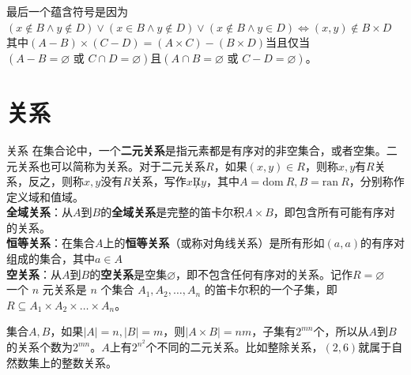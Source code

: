 最后一个蕴含符号是因为$(x \notin B \land y \notin D)\lor(x \in B \land y \notin D)\lor(x \notin B \land y \in D)\Leftrightarrow (x,y) \notin B \times D$\\
其中$(A-B)\times(C-D)=(A\times C)-(B\times D)$当且仅当$(A-B=\varnothing\text{ 或 }C\cap D=\varnothing)$且$(A\cap B=\varnothing\text{ 或 }C-D=\varnothing)$。
\section{关系}
\begin{definition}{关系}{}
在集合论中，一个\textbf{二元关系}是指元素都是有序对的非空集合，或者空集。二元关系也可以简称为关系。对于二元关系$R$，如果$(x,y)\in R$，则称$x,y$有$R$关系，反之，则称$x,y$没有$R$关系，写作$x\not Ry$，其中$A=\text{dom}~R,B=\text{ran}~R$，分别称作定义域和值域。\\
\textbf{全域关系}：从$A$到$B$的\textbf{全域关系}是完整的笛卡尔积$A \times B$，即包含所有可能有序对的关系。\\
\textbf{恒等关系}：在集合$A$上的\textbf{恒等关系}（或称对角线关系）是所有形如$(a,a)$的有序对组成的集合，其中$a \in A$\\
\textbf{空关系}：从$A$到$B$的\textbf{空关系}是空集$\varnothing$，即不包含任何有序对的关系。记作$R = \varnothing$\\
一个 $n$ 元关系是 $n$ 个集合 $A_1, A_2, \dots, A_n$ 的笛卡尔积的一个子集，即 $R \subseteq A_1 \times A_2 \times \dots \times A_n$。
\end{definition}
集合$A,B$，如果$|A|=n,|B|=m$，则$|A\times B|=nm$，子集有$2^{mn}$个，所以从$A$到$B$的关系个数为$2^{mn}$。$A$上有$2^{n^2}$个不同的二元关系。比如整除关系，$(2,6)$就属于自然数集上的整数关系。

